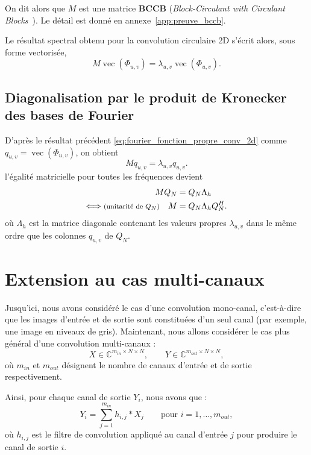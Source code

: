 On dit alors que $M$ est une matrice \textbf{BCCB} (\textit{Block-Circulant with Circulant Blocks}~\cite{jain1989fundamentals}).
Le détail est donné en annexe~\ref{app:preuve_bccb}.

Le résultat spectral obtenu pour la convolution circulaire 2D s'écrit alors, sous forme vectorisée,
\[
    M\operatorname{vec}(\Phi_{u,v})
    =
    \lambda_{u,v}\operatorname{vec}(\Phi_{u,v}).
\]

\subsection{Diagonalisation par le produit de Kronecker des bases de Fourier}

D'après le résultat précédent \ref{eq:fourier_fonction_propre_conv_2d} comme \(q_{u,v}=\operatorname{vec}(\Phi_{u,v})\), on obtient
\[
    M q_{u,v}
    =
    \lambda_{u,v} q_{u,v}.
\]
l'égalité matricielle pour toutes les fréquences devient
\begin{equation}
    \begin{split}
        M Q_N &= Q_N \Lambda_h \\
        \Longleftrightarrow \text{\footnotesize (unitarité de $Q_N$)} \quad M &= Q_N \Lambda_h Q_N^H.
    \end{split}
    \label{eq:diagonalisation_conv_2d}
\end{equation}
où $\Lambda_h$ est la matrice diagonale contenant les valeurs propres $\lambda_{u,v}$
dans le même ordre que les colonnes $q_{u,v}$ de $Q_N$.

\section{Extension au cas multi-canaux}

Jusqu'ici, nous avons considéré le cas d'une convolution mono-canal, c'est-à-dire que les images 
d'entrée et de sortie sont constituées d'un seul canal (par exemple, une image en niveaux de gris). 
Maintenant, nous allons considérer le cas plus général d'une convolution multi-canaux :
\[
    X \in\mathbb{C}^{m_{in} \times N \times N}, \qquad Y \in\mathbb{C}^{m_{out} \times N \times N},
\]
où $m_{in}$ et $m_{out}$ désignent le nombre de canaux d'entrée et de sortie respectivement.

Ainsi, pour chaque canal de sortie $Y_i$, nous avons que :
\begin{equation}
    Y_i = \sum_{j=1}^{m_{in}} h_{i,j} * X_j \qquad\text{pour } i=1,\dots,m_{out},
    \label{eq:conv_multi}
\end{equation}
où $h_{i,j}$ est le filtre de convolution appliqué au canal d'entrée $j$ pour produire le canal de sortie $i$.


